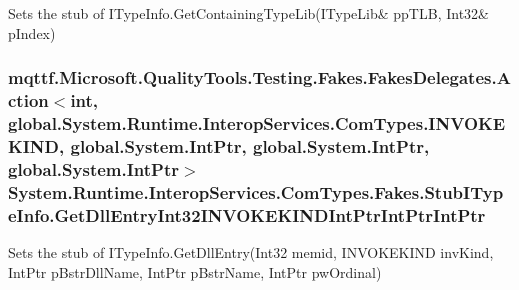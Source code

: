 Sets the stub of I\-Type\-Info.\-Get\-Containing\-Type\-Lib(I\-Type\-Lib\& pp\-T\-L\-B, Int32\& p\-Index)

\hypertarget{class_system_1_1_runtime_1_1_interop_services_1_1_com_types_1_1_fakes_1_1_stub_i_type_info_a9c929c44ed05b1d45d86a593786cd7a3}{
\subsubsection[{Get\-Dll\-Entry\-Int32\-I\-N\-V\-O\-K\-E\-K\-I\-N\-D\-Int\-Ptr\-Int\-Ptr\-Int\-Ptr}]{\setlength{\rightskip}{0pt plus 5cm}mqttf.\-Microsoft.\-Quality\-Tools.\-Testing.\-Fakes.\-Fakes\-Delegates.\-Action$<$int, global.\-System.\-Runtime.\-Interop\-Services.\-Com\-Types.\-I\-N\-V\-O\-K\-E\-K\-I\-N\-D, global.\-System.\-Int\-Ptr, global.\-System.\-Int\-Ptr, global.\-System.\-Int\-Ptr$>$ System.\-Runtime.\-Interop\-Services.\-Com\-Types.\-Fakes.\-Stub\-I\-Type\-Info.\-Get\-Dll\-Entry\-Int32\-I\-N\-V\-O\-K\-E\-K\-I\-N\-D\-Int\-Ptr\-Int\-Ptr\-Int\-Ptr}}\label{class_system_1_1_runtime_1_1_interop_services_1_1_com_types_1_1_fakes_1_1_stub_i_type_info_a9c929c44ed05b1d45d86a593786cd7a3}


Sets the stub of I\-Type\-Info.\-Get\-Dll\-Entry(\-Int32 memid, I\-N\-V\-O\-K\-E\-K\-I\-N\-D inv\-Kind, Int\-Ptr p\-Bstr\-Dll\-Name, Int\-Ptr p\-Bstr\-Name, Int\-Ptr pw\-Ordinal)

